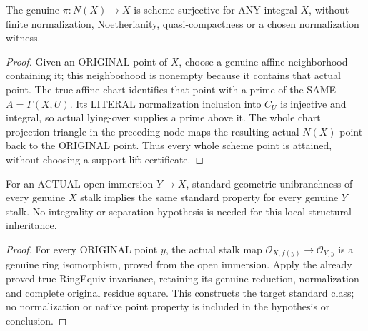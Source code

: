 \begin{theorem}
\label{scheme:actual-integral-normalization-surjective}
The genuine $\pi:N(X)\to X$ is scheme-surjective for ANY integral
$X$, without finite normalization, Noetherianity, quasi-compactness
or a chosen normalization witness.
\leanok
\end{theorem}
\begin{proof}
Given an ORIGINAL point of $X$, choose a genuine affine neighborhood
containing it; this neighborhood is nonempty because it contains
that actual point. The true affine chart identifies that point
with a prime of the SAME $A=\Gamma(X,U)$. Its LITERAL normalization
inclusion into $C_U$ is injective and integral, so actual lying-over
supplies a prime above it. The whole chart projection triangle in
the preceding node maps the resulting actual $N(X)$ point back
to the ORIGINAL point. Thus every whole scheme point is attained,
without choosing a support-lift certificate.
\end{proof}

\begin{theorem}
\label{scheme:actual-geometric-unibranch-open-inheritance}
For an ACTUAL open immersion $Y\to X$, standard geometric
unibranchness of every genuine $X$ stalk implies the same standard
property for every genuine $Y$ stalk. No integrality or separation
hypothesis is needed for this local structural inheritance.
\leanok
\end{theorem}
\begin{proof}
For every ORIGINAL point $y$, the actual stalk map
$\mathcal O_{X,f(y)}\to\mathcal O_{Y,y}$ is a genuine ring
isomorphism, proved from the open immersion. Apply the already
proved true RingEquiv invariance, retaining its genuine reduction,
normalization and complete original residue square. This constructs
the target standard class; no normalization or native point
property is included in the hypothesis or conclusion.
\end{proof}

